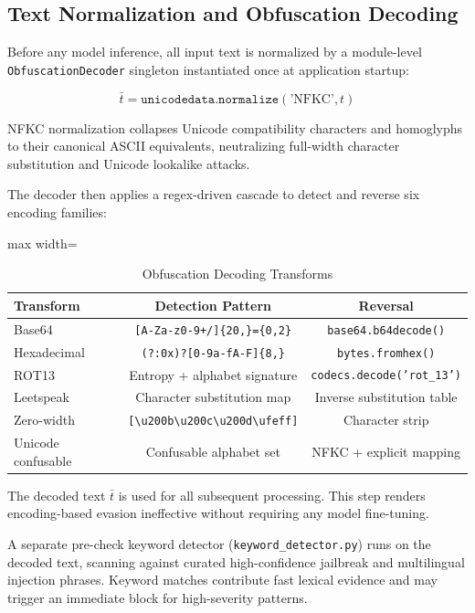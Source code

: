 \documentclass[conference]{IEEEtran}
\begin{document}
\subsection{Text Normalization and Obfuscation Decoding}

Before any model inference, all input text is normalized by a module-level \texttt{ObfuscationDecoder} singleton instantiated once at application startup:


$$\bar{t} = \texttt{unicodedata.normalize}(\text{'NFKC'}, t)$$


NFKC normalization collapses Unicode compatibility characters and homoglyphs to their canonical ASCII equivalents, neutralizing full-width character substitution and Unicode lookalike attacks.


The decoder then applies a regex-driven cascade to detect and reverse six encoding families:


\begin{table}[!t]
\centering
\caption{Obfuscation Decoding Transforms}
\label{tab:1}
\scriptsize
\begin{adjustbox}{max width=\columnwidth}
\begin{tabular}{lcc}
\toprule
Transform & Detection Pattern & Reversal \\
\midrule
Base64 & \texttt{[A-Za-z0-9+/]\{20,\}=\{0,2\}} & \texttt{base64.b64decode()} \\
Hexadecimal & \texttt{(?:0x)?[0-9a-fA-F]\{8,\}} & \texttt{bytes.fromhex()} \\
ROT13 & Entropy + alphabet signature & \texttt{codecs.decode('rot\_13')} \\
Leetspeak & Character substitution map & Inverse substitution table \\
Zero-width & \texttt{[\textbackslash{}u200b\textbackslash{}u200c\textbackslash{}u200d\textbackslash{}ufeff]} & Character strip \\
Unicode confusable & Confusable alphabet set & NFKC + explicit mapping \\
\bottomrule
\end{tabular}
\end{adjustbox}
\end{table}


The decoded text $\bar{t}$ is used for all subsequent processing. This step renders encoding-based evasion ineffective without requiring any model fine-tuning.


A separate pre-check keyword detector (\texttt{keyword\_detector.py}) runs on the decoded text, scanning against curated high-confidence jailbreak and multilingual injection phrases. Keyword matches contribute fast lexical evidence and may trigger an immediate block for high-severity patterns.
\end{document}

